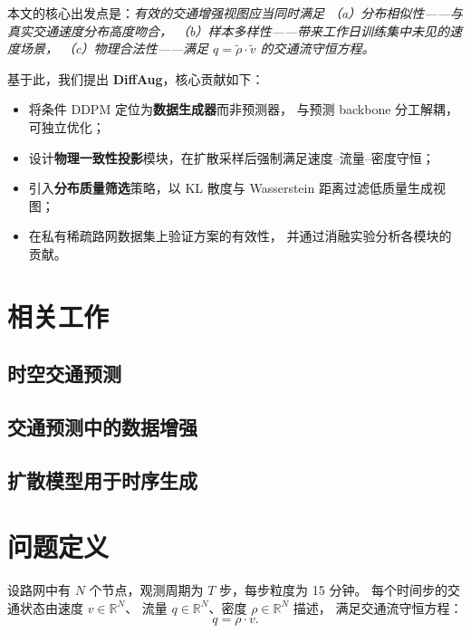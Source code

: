 \documentclass[12pt]{article}
\begin{document}
本文的核心出发点是：\textit{有效的交通增强视图应当同时满足
（a）分布相似性——与真实交通速度分布高度吻合，
（b）样本多样性——带来工作日训练集中未见的速度场景，
（c）物理合法性——满足 $q = \tilde{\rho} \cdot \tilde{v}$ 的交通流守恒方程。}

基于此，我们提出 \textbf{DiffAug}，核心贡献如下：
\begin{itemize}
  \item 将条件 DDPM 定位为\textbf{数据生成器}而非预测器，
    与预测 backbone 分工解耦，可独立优化；
  \item 设计\textbf{物理一致性投影}模块，在扩散采样后强制满足速度–流量–密度守恒；
  \item 引入\textbf{分布质量筛选}策略，以 KL 散度与 Wasserstein 距离过滤低质量生成视图；
  \item 在私有稀疏路网数据集上验证方案的有效性，
    并通过消融实验分析各模块的贡献。
\end{itemize}

\section{相关工作}
\label{sec:related}

\subsection{时空交通预测}

\subsection{交通预测中的数据增强}

\subsection{扩散模型用于时序生成}

\section{问题定义}
\label{sec:problem}

设路网中有 $N$ 个节点，观测周期为 $T$ 步，每步粒度为 15 分钟。
每个时间步的交通状态由速度 $v \in \mathbb{R}^N$、
流量 $q \in \mathbb{R}^N$、密度 $\rho \in \mathbb{R}^N$ 描述，
满足交通流守恒方程：
\begin{equation}
  q = \rho \cdot v.
  \label{eq:traffic_fundamental}
\end{equation}
\end{document}
